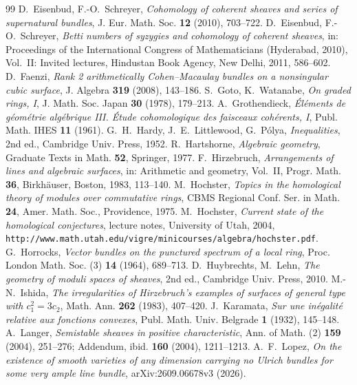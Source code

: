 \documentclass[11pt]{amsart}
\theoremstyle{remark}
\theoremstyle{definition}
\begin{document}
\begin{thebibliography}{99}
 D.~Eisenbud, F.-O.~Schreyer, \emph{Cohomology of coherent sheaves and series of supernatural bundles}, J. Eur. Math. Soc. \textbf{12} (2010), 703--722.
 D.~Eisenbud, F.-O.~Schreyer, \emph{Betti numbers of syzygies and cohomology of coherent sheaves}, in: Proceedings of the International Congress of Mathematicians (Hyderabad, 2010), Vol.~II: Invited lectures, Hindustan Book Agency, New Delhi, 2011, 586--602.
 D.~Faenzi, \emph{Rank 2 arithmetically Cohen--Macaulay bundles on a nonsingular cubic surface}, J. Algebra \textbf{319} (2008), 143--186.
 S.~Goto, K.~Watanabe, \emph{On graded rings, I}, J. Math. Soc. Japan \textbf{30} (1978), 179--213.
 A.~Grothendieck, \emph{\'El\'ements de g\'eom\'etrie alg\'ebrique III. \'Etude cohomologique des faisceaux coh\'erents, I}, Publ. Math. IHES \textbf{11} (1961).
 G.~H.~Hardy, J.~E.~Littlewood, G.~P\'olya, \emph{Inequalities}, 2nd ed., Cambridge Univ. Press, 1952.
 R.~Hartshorne, \emph{Algebraic geometry}, Graduate Texts in Math. \textbf{52}, Springer, 1977.
 F.~Hirzebruch, \emph{Arrangements of lines and algebraic surfaces}, in: Arithmetic and geometry, Vol.~II, Progr. Math. \textbf{36}, Birkh\"auser, Boston, 1983, 113--140.
 M.~Hochster, \emph{Topics in the homological theory of modules over commutative rings}, CBMS Regional Conf. Ser. in Math. \textbf{24}, Amer. Math. Soc., Providence, 1975.
 M.~Hochster, \emph{Current state of the homological conjectures}, lecture notes, University of Utah, 2004, \texttt{http://www.math.utah.edu/vigre/minicourses/algebra/hochster.pdf}.
 G.~Horrocks, \emph{Vector bundles on the punctured spectrum of a local ring}, Proc. London Math. Soc. (3) \textbf{14} (1964), 689--713.
 D.~Huybrechts, M.~Lehn, \emph{The geometry of moduli spaces of sheaves}, 2nd ed., Cambridge Univ. Press, 2010.
 M.-N.~Ishida, \emph{The irregularities of Hirzebruch's examples of surfaces of general type with $c_1^2=3c_2$}, Math. Ann. \textbf{262} (1983), 407--420.
 J.~Karamata, \emph{Sur une in\'egalit\'e relative aux fonctions convexes}, Publ. Math. Univ. Belgrade \textbf{1} (1932), 145--148.
 A.~Langer, \emph{Semistable sheaves in positive characteristic}, Ann. of Math. (2) \textbf{159} (2004), 251--276; Addendum, ibid. \textbf{160} (2004), 1211--1213.
 A.~F.~Lopez, \emph{On the existence of smooth varieties of any dimension carrying no Ulrich bundles for some very ample line bundle}, arXiv:2609.06678v3 (2026).

\end{thebibliography}
\end{document}
